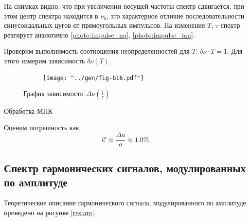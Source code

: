 На снимках видно, что при увеличении несущей частоты спектр сдвигается, при этом центр спектра находится в $\nu_0$, это характерное отличие последовательности синусоидальных цугов от прямоугольных импульсов. На изменения $T$, $\tau$ спектр реагирует аналогично \ref{photo:impulse_nu}, \ref{photo:impulse_tau}.

Проверим выполнимость соотношения неопределенностей для $T$: $\delta \nu \cdot T = 1$. Для этого измерим зависимость $\delta \nu(T)$.

\begin{figure}[H]
	\begin{minipage}[H]{.5\textwidth}
		\begin{figure}[H]
			\centering
			\texttt{[image: "../gen/fig-b16.pdf"]}
			\label{fig:b16}
		\end{figure}
	\end{minipage}%
	\begin{minipage}[H]{.5\textwidth}
		\begin{table}[H]
			\centering
			
		\end{table}
	\end{minipage}
	\vspace*{-20pt}
	\caption{График зависимости $\Delta\nu(\frac{1}{\tau})$ }
	\label{tab:b16}
\end{figure}

\begin{table}[H]
	\centering
	
	\caption{Обработка МНК}
	\label{tab:b16-mnk}
\end{table}

Оценим погрешность как
$$\mathcal{C} \approx \frac{\Delta a}{a} \approx 1.0 \%.$$

\subsection*{Спектр гармонических сигналов, модулированных по амплитуде}

Теоретическое описание гармонического сигнала, модулированного по амплитуде приведено на рисунке \ref{res:am}.

